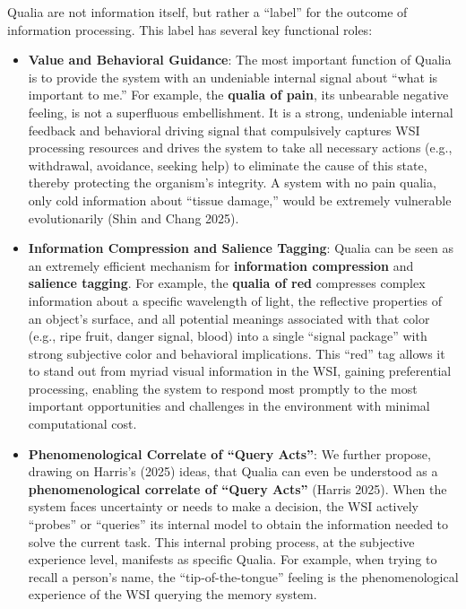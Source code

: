 \documentclass[
  a4paper]{article}
\providecommand{\tightlist}{%
  \setlength{\itemsep}{0pt}\setlength{\parskip}{0pt}}
\begin{document}
Qualia are not information itself, but rather a ``label'' for the
outcome of information processing. This label has several key functional
roles:

\begin{itemize}
\tightlist
\item
  \textbf{Value and Behavioral Guidance}: The most important function of
  Qualia is to provide the system with an undeniable internal signal
  about ``what is important to me.'' For example, the \textbf{qualia of
  pain}, its unbearable negative feeling, is not a superfluous
  embellishment. It is a strong, undeniable internal feedback and
  behavioral driving signal that compulsively captures WSI processing
  resources and drives the system to take all necessary actions (e.g.,
  withdrawal, avoidance, seeking help) to eliminate the cause of this
  state, thereby protecting the organism's integrity. A system with no
  pain qualia, only cold information about ``tissue damage,'' would be
  extremely vulnerable evolutionarily (Shin and Chang 2025).
\item
  \textbf{Information Compression and Salience Tagging}: Qualia can be
  seen as an extremely efficient mechanism for \textbf{information
  compression} and \textbf{salience tagging}. For example, the
  \textbf{qualia of red} compresses complex information about a specific
  wavelength of light, the reflective properties of an object's surface,
  and all potential meanings associated with that color (e.g., ripe
  fruit, danger signal, blood) into a single ``signal package'' with
  strong subjective color and behavioral implications. This ``red'' tag
  allows it to stand out from myriad visual information in the WSI,
  gaining preferential processing, enabling the system to respond most
  promptly to the most important opportunities and challenges in the
  environment with minimal computational cost.
\item
  \textbf{Phenomenological Correlate of ``Query Acts''}: We further
  propose, drawing on Harris's (2025) ideas, that Qualia can even be
  understood as a \textbf{phenomenological correlate of ``Query Acts''}
  (Harris 2025). When the system faces uncertainty or needs to make a
  decision, the WSI actively ``probes'' or ``queries'' its internal
  model to obtain the information needed to solve the current task. This
  internal probing process, at the subjective experience level,
  manifests as specific Qualia. For example, when trying to recall a
  person's name, the ``tip-of-the-tongue'' feeling is the
  phenomenological experience of the WSI querying the memory system.
\end{itemize}
\end{document}
